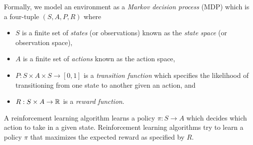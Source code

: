 Formally, we model an environment as a \emph{Markov decision process} (MDP)
which is a four-tuple $(S, A, P, R)$ where
\begin{itemize}
  \setlength\itemsep{0em}
  \item
    $S$ is a finite set of \emph{states} (or observations) known as the
    \emph{state space} (or observation space),
  \item
    $A$ is a finite set of \emph{actions} known as the action space,
  \item
    $P: S \times A \times S \to [0, 1]$ is a \emph{transition function} which
    specifies the likelihood of transitioning from one state to another given
    an action, and
  \item
    $R: S \times A \to \mathbb{R}$ is a \emph{reward function}.
\end{itemize}
A reinforcement learning algorithm learns a policy $\pi: S \to A$ which decides
which action to take in a given state. Reinforcement learning algorithms try to
learn a policy $\pi$ that maximizes the expected reward as specified by $R$.
